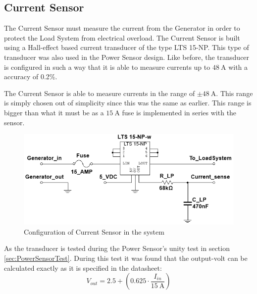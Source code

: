 \subsection{Current Sensor}
The Current Sensor must measure the current from the Generator in order to protect the Load System from electrical overload. The Current Sensor is built using a Hall-effect based current transducer of the type LTS 15-NP\cite{CurrentTransducer}. This type of transducer was also used in the Power Sensor design. Like before, the transducer is configured in such a way that it is able to measure currents up to $\SI{48}{\ampere}$ with a accuracy of 0.2\%.

The Current Sensor is able to measure currents in the range of $\pm \SI{48}{\ampere}$. This range is simply chosen out of simplicity since this was the same as earlier. This range is bigger than what it must be as a $\SI{15}{\ampere}$ fuse is implemented in series with the sensor.

\begin{figure}[H]
	\centering
	\includegraphics[width=0.8\linewidth]{Hardware/LoadSystem/CurrentSensor}
	\caption{Configuration of Current Sensor in the system}
	\label{fig:CurrentSensorCircuit}
\end{figure}

As the transducer is tested during the Power Sensor's unity test in section \vref{sec:PowerSensorTest}. During this test it was found that the output-volt can be calculated exactly as it is specified in the datasheet:
\begin{equation}
	V_{out} = 2.5 + \left( 0.625 \cdot \frac{I_{in}}{\SI{15}{\ampere}}\right)
\end{equation}